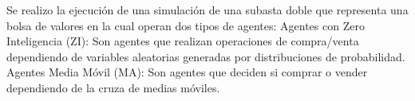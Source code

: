 \markdownRendererInterblockSeparator
{}Se realizo la ejecución de una simulación de una subasta doble que representa una bolsa de valores en la cual operan dos tipos de agentes:\markdownRendererInterblockSeparator
{}\markdownRendererUlBegin
\markdownRendererUlItem Agentes con Zero Inteligencia (ZI): Son agentes que realizan operaciones de compra/venta dependiendo de variables aleatorias generadas por distribuciones de probabilidad.\markdownRendererUlItemEnd 
\markdownRendererUlItem Agentes Media Móvil (MA): Son agentes que deciden si comprar o vender dependiendo de la cruza de medias móviles.\markdownRendererUlItemEnd 
\markdownRendererUlEnd \markdownRendererInterblockSeparator
{}\markdownRendererHorizontalRule{}\relax
